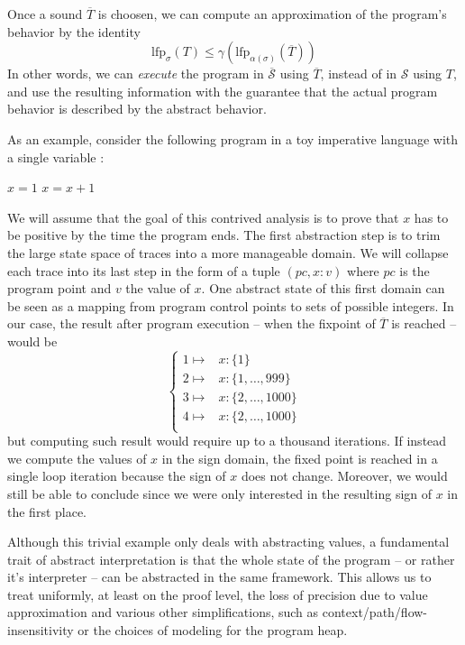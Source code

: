 \documentclass[14pt]{article}
\renewcommand{\S}{\mathcal{S}}
\newcommand{\oS}{\overline{\mathcal{S}}}
\begin{document}
Once a sound $\overline{T}$ is choosen, we can compute an approximation of the program's behavior by the identity
\[ \text{lfp}_\sigma(T) \leq \gamma(\text{lfp}_{\alpha(\sigma)}(\overline{T})) \]
In other words, we can \emph{execute} the program in $\oS$ using $\overline{T}$, instead of in $\S$ using $T$, and use the resulting information with the guarantee that the actual program behavior is described by the abstract behavior.

As an example, consider the following program in a toy imperative language with a single variable :

\begin{algorithmic}[1]
\State $x = 1$
\State $x = x+1$
\EndWhile
\end{algorithmic}


We will assume that the goal of this contrived analysis is to prove that $x$ has to be positive by the time the program ends. The first abstraction step is to trim the large state space of traces into a more manageable domain. We will collapse each trace into its last step in the form of a tuple $\left(pc,x:v\right)$ where $pc$ is the program point and $v$ the value of $x$. One abstract state of this first domain can be seen as a mapping from program control points to sets of possible integers. In our case, the result after program execution -- when the fixpoint of $\overline{T}$ is reached -- would be
\[
\begin{cases}
1 \mapsto & x:\{1\} \\
2 \mapsto & x:\{1, \dots, 999\} \\
3 \mapsto & x:\{2, \dots, 1000\} \\
4 \mapsto & x:\{2, \dots, 1000\} \\
\end{cases}
\]
but computing such result would require up to a thousand iterations. If instead we compute the values of $x$ in the sign domain, the fixed point is reached in a single loop iteration because the sign of $x$ does not change. Moreover, we would still be able to conclude since we were only interested in the resulting sign of $x$ in the first place.

Although this trivial example only deals with abstracting values, a fundamental trait of abstract interpretation is that the whole state of the program -- or rather it's interpreter -- can be abstracted in the same framework. This allows us to treat uniformly, at least on the proof level, the loss of precision due to value approximation and various other simplifications, such as context/path/flow-insensitivity or the choices of modeling for the program heap. 
\end{document}
